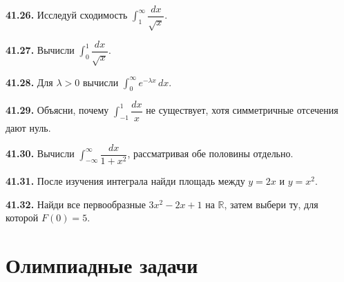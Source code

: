 \noindent\begin{minipage}[t]{\linewidth}\textbf{41.26.} Исследуй сходимость \(\int_1^\infty\dfrac{dx}{\sqrt x}\).\par\end{minipage}\par
\noindent\begin{minipage}[t]{\linewidth}\textbf{41.27.} Вычисли \(\int_0^1\dfrac{dx}{\sqrt x}\).\par\end{minipage}\par
\noindent\begin{minipage}[t]{\linewidth}\textbf{41.28.} Для \(\lambda>0\) вычисли \(\int_0^\infty e^{-\lambda x}\,dx\).\par\end{minipage}\par
\noindent\begin{minipage}[t]{\linewidth}\textbf{41.29.}\starmark{} Объясни, почему \(\int_{-1}^1\dfrac{dx}{x}\) не существует, хотя симметричные отсечения дают нуль.\par\end{minipage}\par
\noindent\begin{minipage}[t]{\linewidth}\textbf{41.30.} Вычисли \(\int_{-\infty}^{\infty}\dfrac{dx}{1+x^2}\), рассматривая обе половины отдельно.\par\end{minipage}\par
\noindent\begin{minipage}[t]{\linewidth}\textbf{41.31.} После изучения интеграла найди площадь между \(y=2x\) и \(y=x^2\).\par\end{minipage}\par
\noindent\begin{minipage}[t]{\linewidth}\textbf{41.32.} Найди все первообразные \(3x^2-2x+1\) на \(\mathbb R\), затем выбери ту, для которой \(F(0)=5\).\par\end{minipage}\par
\par{}\section*{Олимпиадные задачи}
